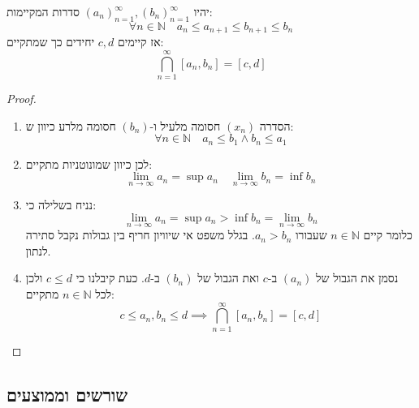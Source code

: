 \documentclass{tstextbook}
\begin{document}
\begin{proposition}
יהיו \((a_n)_{n=1}^\infty,(b_n)_{n=1}^\infty\) סדרות המקיימות:
$$\forall n \in \mathbb{N}\quad a_{n}\leq a_{n+1}\leq b_{n+1}\leq b_{n}$$
אז קיימים \(c,d\) יחידים כך שמתקיים:
$$\bigcap_{n=1}^{\infty} [a_{n},b_{n}]=[c,d]$$

\end{proposition}
\begin{proof}
  \begin{enumerate}
    \item הסדרה \((x_{n})\) חסומה מלעיל ו-\((b_{n})\) חסומה מלרע כיוון ש: 
$$\forall n \in \mathbb{N}\quad  a_{n}\leq b_{1}\land b_{n}\leq a_{1}$$


    \item לכן כיוון שמונוטניות מתקיים: 
$$\lim_{ n \to \infty } a_{n}=\sup a_{n}\quad \lim_{ n \to \infty }b_{n}=\inf b_{n} $$


    \item נניח בשלילה כי: 
$$\lim_{ n \to \infty } a_{n}=\sup a_{n}>\inf b_{n}=\lim_{ n \to \infty }b_{n}$$
כלומר קיים \(n \in \mathbb{N}\) שעבורו \(a_{n}> b_{n}\). בגלל משפט אי שיוויון חריף בין גבולות נקבל סתירה לנתון.


    \item נסמן את הגבול של \((a_{n})\) ב-\(c\) ואת הגבול של \((b_{n})\) ב-\(d\). כעת קיבלנו כי \(c\leq d\) ולכן לכל \(n \in \mathbb{N}\) מתקיים: 
$$c\leq a_{n},b_{n}\leq d\implies \bigcap_{n=1}^{\infty} [a_{n},b_{n}]=[c,d]$$


  \end{enumerate}
\end{proof}
\subsection{שורשים וממוצעים}
\end{document}
